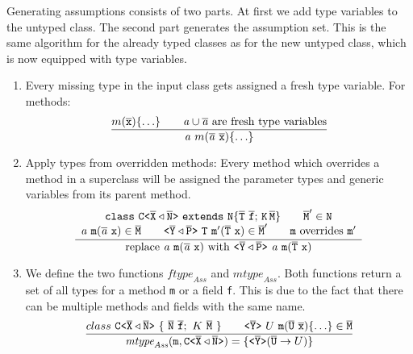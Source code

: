 \documentclass[a4paper,USenglish,cleveref, autoref, thm-restate]{lipics-v2021}
\begin{document}

Generating assumptions consists of two parts.
At first we add type variables to the untyped class.
The second part generates the assumption set.
This is the same algorithm for the already typed classes as for the 
new untyped class, which is now equipped with type variables.

\begin{enumerate}
\item Every missing type in the input class gets assigned a fresh type variable.
For methods:
\begin{align*}
  \frac{\displaystyle 
  m(\overline{\tt x}) \{ \ldots \} \quad \quad \mathit{ a } \cup \overline{\tt \mathit{ a }} \ \text{are fresh type variables}
  }{\displaystyle 
  \mathit{ a }\ m(\overline{\tt \mathit{ a }}\ \overline{\tt x}) \{ \ldots \}
  }
  \end{align*}
\item Apply types from overridden methods:
Every method which overrides a method in a superclass will be assigned the parameter types and generic variables from its parent method.
\begin{align*}
\frac{\displaystyle 
  \begin{array}{c}
  \mathtt{class } \ \mathtt{C \texttt{<} \overline{\tt X} \triangleleft \overline{\tt N} \texttt{>} } \ \mathtt{ extends } \ \mathtt{N \{ \overline{T} \ \overline{f}; \, K \, \overline{M} \}} \quad \quad \mathtt{ \overline{\tt M}' \in N }\\
  \mathtt{\mathit{ a }\ m(\overline{\tt \mathit{ a }}\ x) \in \overline{\tt M} \quad \quad \mathtt{ \texttt{<} \overline{\tt Y} \triangleleft \overline{\tt P} \texttt{>} }\ T\ m'(\overline{\tt T}\ x) \in \overline{\tt M}'  \quad \quad m\ \text{overrides}\ m'}
  \end{array}
}{\displaystyle 
  \text{replace}\ \mathtt{\mathit{ a }\ m(\overline{\tt \mathit{ a }}\ x)} \ \text{with}\ \mathtt{\mathtt{ \texttt{<} \overline{\tt Y} \triangleleft \overline{\tt P} \texttt{>} }\ \mathit{ a }\ m(\overline{\tt T}\ x)}
}
\end{align*}
\item We define the two functions $\textit{ftype}_\textit{Ass}$ and $\textit{mtype}_\textit{Ass}$.
Both functions return a set of all types for a method \texttt{m} or a field \texttt{f}.
This is due to the fact that there can be multiple methods and fields with the same name.
\begin{align*}
  \frac{\displaystyle 
    class\ \mathtt{C \texttt{<} \overline{\tt X} \triangleleft \overline{\tt N} \texttt{>} }\ \{\ \overline{\tt N}\ \overline{\tt f};\ K\ \overline{\tt M}\ \} \quad \quad
    \mathtt{ \texttt{<} \overline{\tt Y} \texttt{>} }\ U\ \texttt{m}(\overline{\tt U}\ \overline{\tt x}) \{ \ldots \} \in \overline{\tt M}
  }{\displaystyle 
    \textit{mtype}_\textit{Ass}(\texttt{m}, \mathtt{C \texttt{<} \overline{\tt X} \triangleleft \overline{\tt N} \texttt{>} }) =  \{ \mathtt{ \texttt{<} \overline{\tt Y} \texttt{>} } (\overline{\tt U} \to U ) \}
  }
\end{align*}

\end{enumerate}
\end{document}
